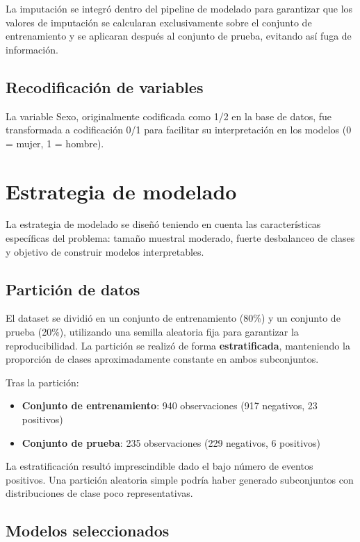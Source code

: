 \documentclass[12pt, a4paper, oneside]{report}
\begin{document}
La imputación se integró dentro del pipeline de modelado para garantizar que los valores de imputación se calcularan exclusivamente sobre el conjunto de entrenamiento y se aplicaran después al conjunto de prueba, evitando así fuga de información.

\subsection{Recodificación de variables}

La variable Sexo, originalmente codificada como 1/2 en la base de datos, fue transformada a codificación 0/1 para facilitar su interpretación en los modelos (0 = mujer, 1 = hombre).

\section{Estrategia de modelado}

La estrategia de modelado se diseñó teniendo en cuenta las características específicas del problema: tamaño muestral moderado, fuerte desbalanceo de clases y objetivo de construir modelos interpretables.

\subsection{Partición de datos}

El dataset se dividió en un conjunto de entrenamiento (80\%) y un conjunto de prueba (20\%), utilizando una semilla aleatoria fija para garantizar la reproducibilidad. La partición se realizó de forma \textbf{estratificada}, manteniendo la proporción de clases aproximadamente constante en ambos subconjuntos.

Tras la partición:
\begin{itemize}
    \item \textbf{Conjunto de entrenamiento}: 940 observaciones (917 negativos, 23 positivos)
    \item \textbf{Conjunto de prueba}: 235 observaciones (229 negativos, 6 positivos)
\end{itemize}

La estratificación resultó imprescindible dado el bajo número de eventos positivos. Una partición aleatoria simple podría haber generado subconjuntos con distribuciones de clase poco representativas.

\subsection{Modelos seleccionados}
\end{document}
